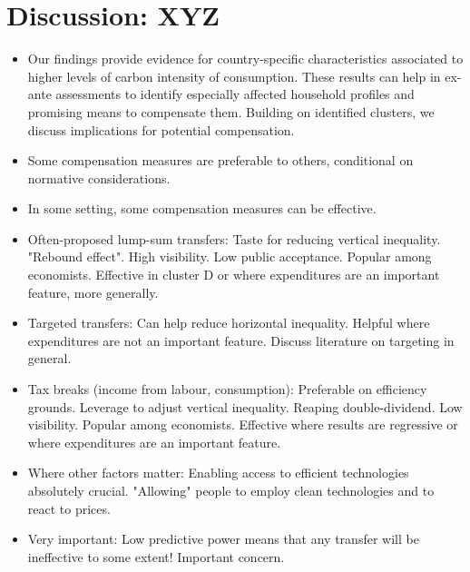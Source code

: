 \documentclass[12pt, a4paper]{article}
\begin{document}
\section{Discussion: XYZ} \label{sec:discussion}

\begin{itemize}
\item Our findings provide evidence for country-specific characteristics associated to higher levels of carbon intensity of consumption. These results can help in ex-ante assessments to identify especially affected household profiles and promising means to compensate them. Building on identified clusters, we discuss implications for potential compensation.
\item Some compensation measures are preferable to others, conditional on normative considerations.
\item In some setting, some compensation measures can be effective.
\item Often-proposed lump-sum transfers: Taste for reducing vertical inequality. "Rebound effect". High visibility. Low public acceptance. Popular among economists. Effective in cluster D or where expenditures are an important feature, more generally.
\item Targeted transfers: Can help reduce horizontal inequality. Helpful where expenditures are not an important feature. Discuss literature on targeting in general.
\item Tax breaks (income from labour, consumption): Preferable on efficiency grounds. Leverage to adjust vertical inequality. Reaping double-dividend. Low visibility. Popular among economists. Effective where results are regressive or where expenditures are an important feature.
\item Where other factors matter: Enabling access to efficient technologies absolutely crucial. "Allowing" people to employ clean technologies and to react to prices.
\item Very important: Low predictive power means that any transfer will be ineffective to some extent! Important concern.

\end{itemize}
\end{document}
